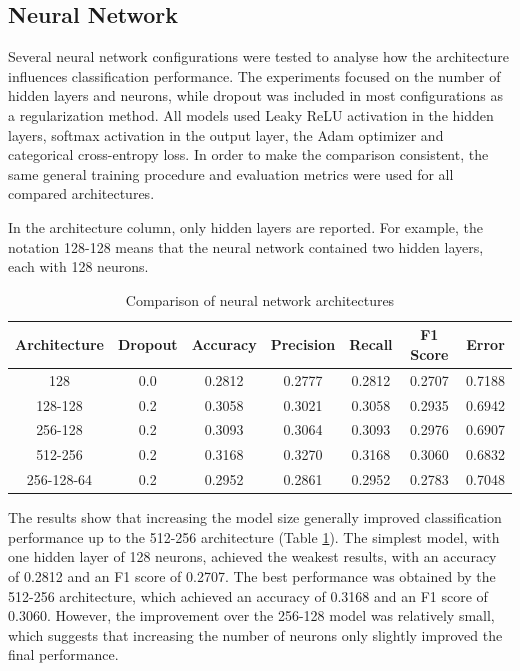 \documentclass[
onecolumn,
]{ceurart}
\begin{document}
	\subsection{Neural Network}
  Several neural network configurations were tested to analyse how the architecture influences classification performance. The experiments focused on the number of hidden layers and neurons, while dropout was included in most configurations as a regularization method. All models used Leaky ReLU activation in the hidden layers, softmax activation in the output layer, the Adam optimizer and categorical cross-entropy loss. In order to make the comparison consistent, the same general training procedure and evaluation metrics were used for all compared architectures.
  
  
  In the architecture column, only hidden layers are reported. For example, the notation 128-128 means that the neural network contained two hidden layers, each with 128 neurons.
  
  \begin{table}[htbp]
    \centering
    \caption{Comparison of neural network architectures}
    \begin{tabular}{|c|c|c|c|c|c|c|}
      \hline
      Architecture & Dropout & Accuracy & Precision & Recall & F1 Score & Error \\\hline
      128 & 0.0 & 0.2812 & 0.2777 & 0.2812 & 0.2707 & 0.7188 \\\hline
      128-128 & 0.2 & 0.3058 & 0.3021 & 0.3058 & 0.2935 & 0.6942 \\\hline
      256-128 & 0.2 & 0.3093 & 0.3064 & 0.3093 & 0.2976 & 0.6907 \\\hline
      512-256 & 0.2 & 0.3168 & 0.3270 & 0.3168 & 0.3060 & 0.6832 \\\hline
      256-128-64 & 0.2 & 0.2952 & 0.2861 & 0.2952 & 0.2783 & 0.7048 \\\hline
    \end{tabular}
    \label{nnac}
  \end{table}

  The results show that increasing the model size generally improved classification performance up to the 512-256 architecture (Table \ref{nnac}). The simplest model, with one hidden layer of 128 neurons, achieved the weakest results, with an accuracy of 0.2812 and an F1 score of 0.2707. The best performance was obtained by the 512-256 architecture, which achieved an accuracy of 0.3168 and an F1 score of 0.3060. However, the improvement over the 256-128 model was relatively small, which suggests that increasing the number of neurons only slightly improved the final performance.
\end{document}
